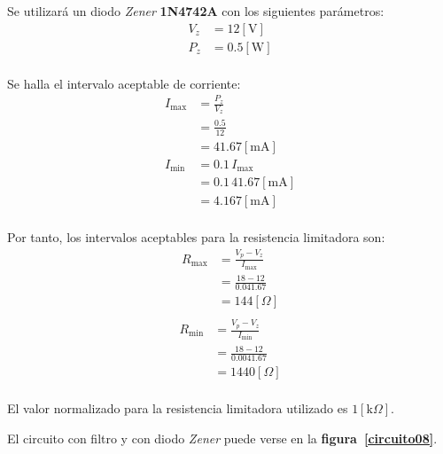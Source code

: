 Se utilizará un diodo \emph{Zener} \textbf{1N4742A} con los siguientes
parámetros:
\begin{equation*}
    \begin{split}
        V_z &= 12[\text{V}]\\
        P_z &= 0.5[\text{W}]\\
    \end{split}
\end{equation*}

Se halla el intervalo aceptable de corriente:
\begin{equation*}
    \begin{split}
        I_{\text{max}} &= \frac{P_z}{V_z}\\
                       &= \frac{0.5}{12}\\
                       &= 41.67[\text{mA}]\\
        I_{\text{min}} &= 0.1\,I_{\text{max}}\\
                       &= 0.1\,41.67[\text{mA}]\\
                       &= 4.167[\text{mA}]\\
    \end{split}
\end{equation*}

Por tanto, los intervalos aceptables para la resistencia limitadora son:
\begin{equation*}
    \begin{split}
        R_{\text{max}} &= \frac{V_p - V_z}{I_{\text{max}}}\\
                       &= \frac{18 - 12}{0.041.67}\\
                       &= 144[\Omega]\\
    \end{split}
\end{equation*}
\begin{equation*}
    \begin{split}
        R_{\text{min}} &= \frac{V_p - V_z}{I_{\text{min}}}\\
                       &= \frac{18 - 12}{0.0041.67}\\
                       &= 1440[\Omega]\\
    \end{split}
\end{equation*}

El valor normalizado para la resistencia limitadora utilizado es
$1[\text{k}\Omega]$.

El circuito con filtro y con diodo \emph{Zener} puede verse en la
\textbf{figura~\ref{circuito08}}.

